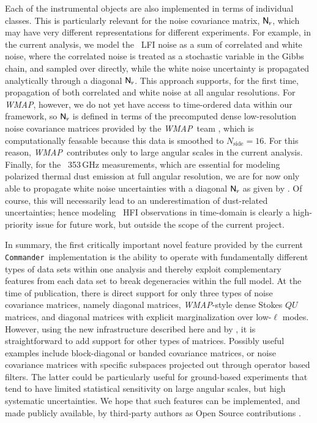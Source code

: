 \documentclass[twocolumn]{aa}
\def\WMAP{\textit{WMAP}}
\def\nside{N_{\mathrm{side}}}
\def\commander{\texttt{Commander}}
\newcommand{\N}[0]{\tens{N}}
\newcommand{\?}[1]{\textcolor{red}{{\bf [#1]}}}
\begin{document}
Each of the instrumental objects are also implemented in terms of individual
classes. This is particularly relevant for the noise covariance matrix,
$\N_{\nu}$, which may have very different representations for different
experiments. For example, in the current analysis, we model the \Planck\ LFI
noise as a sum of correlated and white noise, where the correlated noise is
treated as a stochastic variable in the Gibbs chain, and sampled over directly,
while the white noise uncertainty is propagated analytically through a diagonal
$\N_{\nu}$. This approach supports, for the first time, propagation of both
correlated and white noise at all angular resolutions. For \WMAP, however, we do
not yet have access to time-ordered data within our framework, so $\N_{\nu}$ is
defined in terms of the precomputed dense low-resolution noise covariance
matrices provided by the \WMAP\ team \citep{bennett2012}, which is
computationally feasable because this data is smoothed to $\nside=16$. For this
reason, \WMAP\ contributes only to large angular scales in the current analysis.
Finally, for the \Planck\ 353\,GHz measurements, which are essential for
modeling polarized thermal dust emission at full angular resolution, we are for
now only able to propagate white noise uncertainties with a diagonal $\N_{\nu}$
as given by \citet{planck2020-LVII}. Of course, this will necessarily lead to an
underestimation of dust-related uncertainties; hence modeling \Planck\ HFI
observations in time-domain is clearly a high-priority issue for future work,
but outside the scope of the current project.

In summary, the first critically important novel feature provided by
the current \commander\ implementation is the ability to operate with
fundamentally different types of data sets within one analysis and
thereby exploit complementary features from each data set to break
degeneracies within the full model. At the time of publication, there
is direct support for only three types of noise covariance matrices,
namely diagonal matrices, \WMAP-style dense Stokes $QU$ matrices, and
diagonal matrices with explicit marginalization over low-$\ell$
modes. However, using the new infrastructure described here and by
\citet{bp03}, it is straightforward to add support for other types of
matrices. Possibly useful examples include block-diagonal or banded
covariance matrices, or noise covariance matrices with specific
subspaces projected out through operator based filters. The latter
could be particularly useful for ground-based experiments that tend to
have limited statistical sensitivity on large angular scales, but high
systematic uncertainties. We hope that such features can be
implemented, and made publicly available, by third-party authors as
Open Source contributions \citep{bp05}.
\end{document}

